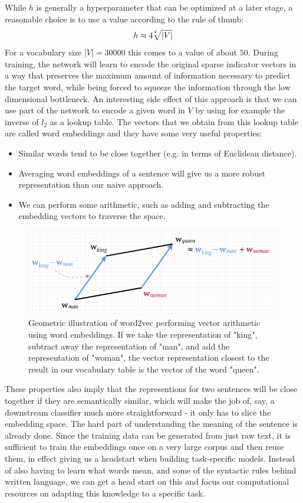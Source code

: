 While $h$ is generally a hyperparameter that can be optimized at a later stage, a reasonable choice is to use a value according to the rule of thumb:
\begin{equation}
  h \approx 4\sqrt[\leftroot{3} \uproot{3} 4]{|V|}
\end{equation}
For a vocabulary size $|V| = 30000$ this comes to a value of about $50$.
During training, the network will learn to encode the original sparse indicator vectors in a way that preserves the maximum amount of information necessary to predict the target word, while being forced to squeeze the information through the low dimensional bottleneck.
An interesting side effect of this approach is that we can use part of the network to encode a given word in $V$ by using for example the inverse of $l_2$ as a lookup table.
The vectors that we obtain from this lookup table are called word embeddings and they have some very useful properties:
\begin{itemize}
    \item Similar words tend to be close together (e.g. in terms of Euclidean distance).
    \item Averaging word embeddings of a sentence will give us a more robust representation than our naive approach.
    \item We can perform some arithmetic, such as adding and subtracting the embedding vectors to traverse the space.
\end{itemize}
\begin{figure}
  \includegraphics[width=\linewidth]{chapters/NLP/figures/king-man+woman.png}
  \caption{Geometric illustration of word2vec performing vector arithmetic using word embeddings. If we take the representation of "king", subtract away the representation of "man", and add the representation of "woman", the vector representation closest to the result in our vocabulary table is the vector of the word "queen".}
  \label{fig:kingmanwoman}
\end{figure}
These properties also imply that the representions for two sentences will be close together if they are semantically similar, which will make the job of, say, a downstream classifier much more straightforward - it only has to slice the embedding space.
The hard part of understanding the meaning of the sentence is already done.
Since the training data can be generated from just raw text, it is sufficient to train the embeddings once on a very large corpus and then reuse them, in effect giving us a headstart when building task-specific models.\cite{pennington-etal-2014-glove}
Instead of also having to learn what words mean, and some of the syntactic rules behind written language, we can get a head start on this and focus our computational resources on adapting this knowledge to a specific task.

